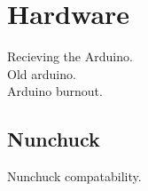       \section{Hardware}
      Recieving the Arduino.\\
        Old arduino.\\
        Arduino burnout.

        \subsection{Nunchuck}
        Nunchuck compatability.\\
